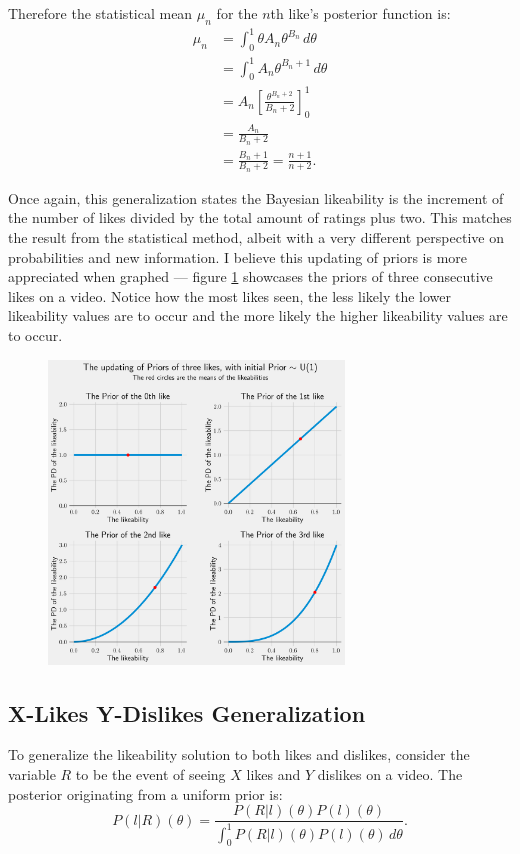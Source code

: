 \documentclass[a4paper,11pt]{article}
\newcommand*\Eval[3]{\left[#1\right]_{#3}^{#2}}
\begin{document}
Therefore the statistical mean $\mu_n$ for the $n$th like's posterior function is:
\begin{align*}
    \mu_n &= \int_0^1 \theta A_n \theta^{B_n} \, d\theta\\
    &= \int_0^1 A_n \theta^{B_n + 1} \, d\theta\\
    &= A_n \Eval{\frac{\theta^{B_n+2}}{B_n+2}}{1}{0}\\
    &= \frac{A_n}{B_n+2}\\
    &= \frac{B_n+1}{B_n+2} = \frac{n+1}{n+2}.
\end{align*}

Once again, this generalization states the Bayesian likeability is the increment of the number of likes divided by the total amount of ratings plus two. This matches the result from the statistical method, albeit with a very different perspective on probabilities and new information. I believe this updating of priors is more appreciated when graphed --- figure \ref{fig:up} showcases the priors of three consecutive likes on a video. Notice how the most likes seen, the less likely the lower likeability values are to occur and the more likely the higher likeability values are to occur.

\begin{figure}[H]
    \centering
    \includegraphics[width=0.7\textwidth]{assets/updating_priors.png}
    \caption{}
    \label{fig:up}
\end{figure}

\subsection{X-Likes Y-Dislikes Generalization}
To generalize the likeability solution to both likes and dislikes, consider the variable $R$ to be the event of seeing $X$ likes and $Y$ dislikes on a video. The posterior originating from a uniform prior is:
\[
    P(l|R)(\theta) = \frac{P(R|l)(\theta) P(l)(\theta)}{\int_0^1 P(R|l)(\theta) P(l)(\theta) \, d\theta}.
\]
\end{document}

